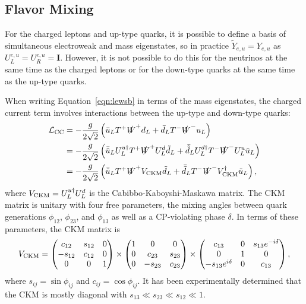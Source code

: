 \subsection{Flavor Mixing}

For the charged leptons and up-type quarks, it is possible to define a basis of simultaneous electroweak and mass eigenstates, so in practice $\tilde Y_{e,u} = Y_{e,u}$ as $U^{e,u}_L = U^{e,u}_R = \mathit{\mathbf{I}}$.
However, it is not possible to do this for the neutrinos at the same time as the charged leptons or for the down-type quarks at the same time as the up-type quarks.

When writing Equation~\ref{eqn:lewsb} in terms of the mass eigenstates, the charged current term involves interactions between the up-type and down-type quarks:
\begin{align}
  \mathcal{L}_{\text{CC}} %
  & = - \frac{g}{2\sqrt{2}} \left( \bar u_L T^+ \slashed W^+ d_L + \bar d_L T^- \slashed W^- u_L \right) \\
  & = - \frac{g}{2\sqrt{2}} \left( \bar{\tilde{u}}_L U^{u\dagger}_L T^+ \slashed W^+ U^d_L \tilde{d}_L + \bar{\tilde{d}}_L U^{d\dagger}_L T^- \slashed W^- U^u_L \tilde{u}_L \right) \\
  & = - \frac{g}{2\sqrt{2}} \left( \bar{\tilde{u}}_L  T^+ \slashed W^+ \vckm \tilde{d}_L + \bar{\tilde{d}}_L T^- \slashed W^- \vckm^\dagger \tilde{u}_L \right),
\end{align}
where $V_{\text{CKM}} = U^{u\dagger}_L U^d_L$ is the Cabibbo-Kaboyshi-Maskawa matrix.
The CKM matrix is unitary with four free parameters, the mixing angles between quark generations $\phi_{12}$, $\phi_{23}$, and $\phi_{13}$ as well as a CP-violating phase $\delta$.
In terms of these parameters, the CKM matrix is
\begin{equation}
  V_{\text{CKM}} = \begin{pmatrix} c_{12} & s_{12} & 0 \\ - s_{12} & c_{12} & 0 \\ 0 & 0 & 1 \end{pmatrix}
  \times \begin{pmatrix} 1 & 0 & 0  \\ 0 & c_{23} & s_{23} \\ 0 & - s_{23} & c_{23} \end{pmatrix}
  \times \begin{pmatrix} c_{13} & 0 & s_{13} e^{-i\delta} \\ 0 & 1 & 0 \\ -s_{13} e^{i\delta} & 0 & c_{13} \end{pmatrix},
\end{equation}
where $s_{ij} = \sin \phi_{ij}$ and $c_{ij} = \cos \phi_{ij}$.
It has been experimentally determined that the CKM is mostly diagonal with $s_{13} \ll s_{23} \ll s_{12} \ll 1$. 

